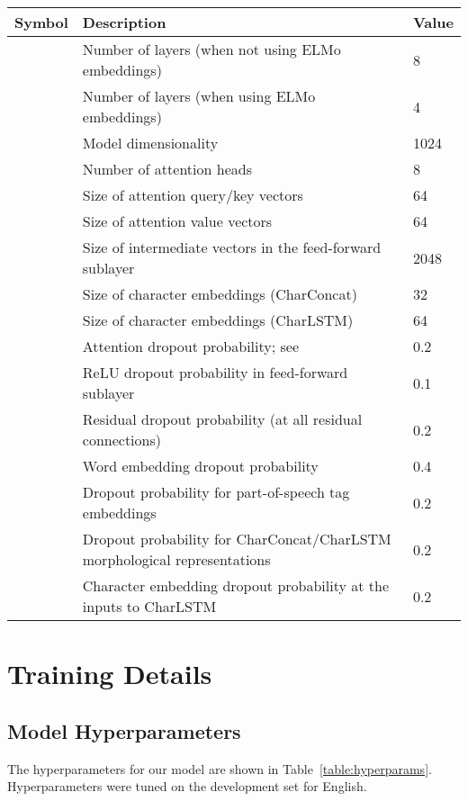 \documentclass[11pt,a4paper]{article}
\begin{document}
\begin{table*}[ht]
\begin{center}
\begin{tabular}{@{}lp{}l@{}}
\toprule
Symbol & Description & Value \\
\midrule
 & Number of layers (when not using ELMo embeddings) & 8 \\
 & Number of layers (when using ELMo embeddings) & 4 \\
 & Model dimensionality & 1024 \\
 & Number of attention heads & 8 \\
 & Size of attention query/key vectors & 64 \\
 & Size of attention value vectors & 64 \\
 & Size of intermediate vectors in the feed-forward sublayer & 2048 \\
& Size of character embeddings (CharConcat) & 32 \\
& Size of character embeddings (CharLSTM) & 64 \\
\midrule
& Attention dropout probability; see \citet{vaswani_attention_2017} & 0.2 \\
& ReLU dropout probability in feed-forward sublayer & 0.1 \\
& Residual dropout probability (at all residual connections) & 0.2 \\
& Word embedding dropout probability & 0.4 \\
& Dropout probability for part-of-speech tag embeddings& 0.2 \\
& Dropout probability for CharConcat/CharLSTM morphological representations & 0.2 \\
& Character embedding dropout probability at the inputs to CharLSTM & 0.2 \\
\bottomrule
\end{tabular}
\end{center}
\caption{
\label{table:hyperparams}
Model hyperparameters used for all of our experiments.
}
\end{table*}
\newpage

\section{Training Details}
\label{sec:hyperparams}

\subsection{Model Hyperparameters}
The hyperparameters for our model are shown in Table~\ref{table:hyperparams}. Hyperparameters were tuned on the development set for English.
\end{document}
